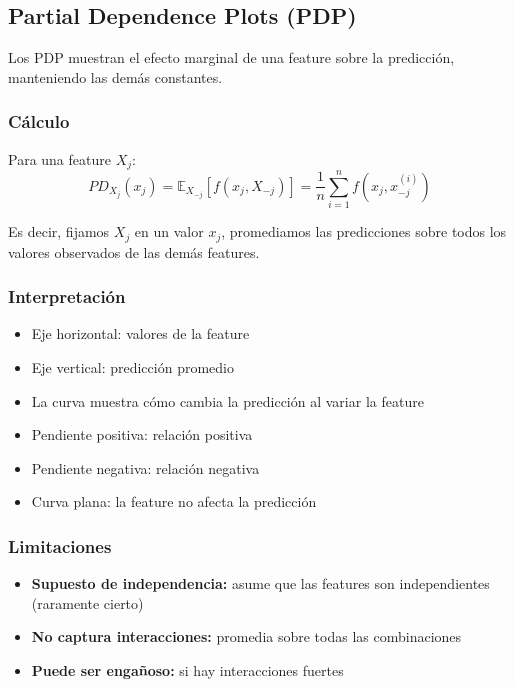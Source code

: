 \documentclass[11pt,a4paper]{article}
\begin{document}
\subsection{Partial Dependence Plots (PDP)}

Los PDP muestran el efecto marginal de una feature sobre la predicción, manteniendo las demás constantes.

\subsubsection{Cálculo}

Para una feature $X_j$:
$$PD_{X_j}(x_j) = \mathbb{E}_{X_{-j}}[f(x_j, X_{-j})] = \frac{1}{n}\sum_{i=1}^{n}f(x_j, x_{-j}^{(i)})$$

Es decir, fijamos $X_j$ en un valor $x_j$, promediamos las predicciones sobre todos los valores observados de las demás features.

\subsubsection{Interpretación}

\begin{itemize}
\item Eje horizontal: valores de la feature
\item Eje vertical: predicción promedio
\item La curva muestra cómo cambia la predicción al variar la feature
\item Pendiente positiva: relación positiva
\item Pendiente negativa: relación negativa
\item Curva plana: la feature no afecta la predicción
\end{itemize}

\subsubsection{Limitaciones}

\begin{itemize}
\item \textbf{Supuesto de independencia:} asume que las features son independientes (raramente cierto)
\item \textbf{No captura interacciones:} promedia sobre todas las combinaciones
\item \textbf{Puede ser engañoso:} si hay interacciones fuertes
\end{itemize}
\end{document}

